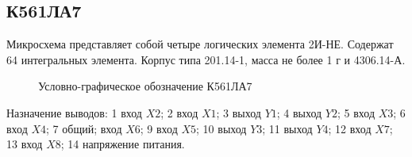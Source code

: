 \subsection*{К561ЛА7}

Микросхема представляет собой четыре логических элемента 2И-НЕ. Содержат 64 интегральных элемента. Корпус типа 201.14-1, масса не более 1 г и 4306.14-А.

\begin{figure}[ht]
  
  \caption{Условно-графическое обозначение К561ЛА7}
  \label{img:k561la7}
\end{figure}

Назначение выводов: 1 \longndash вход $X2$; 2 \longndash вход $X1$; 3 \longndash выход $Y1$; 4 \longndash выход $Y2$; 5 \longndash вход $X3$; 6 \longndash вход $X4$; 7 \longndash общий; \longndash вход $X6$; 9 \longndash вход $X5$; 10 \longndash выход $Y3$; 11 \longndash выход $Y4$; 12 \longndash вход $X7$; 13 \longndash вход $X8$; 14 \longndash напряжение питания.

